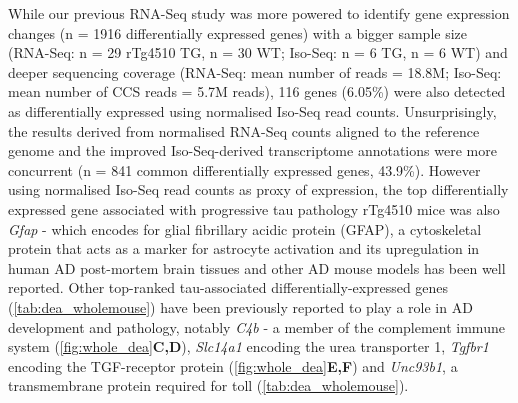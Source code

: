 While our previous RNA-Seq study\cite{Castanho2020} was more powered to identify gene expression changes (n = 1916 differentially expressed genes) with a bigger sample size (RNA-Seq: n = 29 rTg4510 TG, n = 30 WT; Iso-Seq: n = 6 TG, n = 6 WT) and deeper sequencing coverage (RNA-Seq: mean number of reads = 18.8M; Iso-Seq: mean number of CCS reads = 5.7M reads), 116 genes (6.05\%) were also detected as differentially expressed using normalised Iso-Seq read counts. Unsurprisingly, the results derived from normalised RNA-Seq counts aligned to the reference genome and the improved Iso-Seq-derived transcriptome annotations were more concurrent (n = 841 common differentially expressed genes, 43.9\%). However using normalised Iso-Seq read counts as proxy of expression, the top differentially expressed gene associated with progressive tau pathology rTg4510 mice was also \textit{Gfap} - which encodes for glial fibrillary acidic protein (GFAP), a cytoskeletal protein that acts as a marker for astrocyte activation and its upregulation in human AD post-mortem brain tissues and other AD mouse  models has been well reported\cite{Muramori1998,Ishiki2016, Chatterjee2021}. Other top-ranked tau-associated differentially-expressed genes (\cref{tab:dea_wholemouse}) have been previously reported to play a role in AD development and pathology, notably \textit{C4b}\cite{Zorzetto2016} - a member of the complement immune system (\cref{fig:whole_dea}\textbf{C,D}), \textit{Slc14a1}\cite{Castillo2017} encoding the urea transporter 1, \textit{Tgfbr1} encoding the TGF-\textbeta receptor protein (\cref{fig:whole_dea}\textbf{E,F}) and \textit{Unc93b1}\cite{Wirz2013}, a transmembrane protein required for toll (\cref{tab:dea_wholemouse}). 

